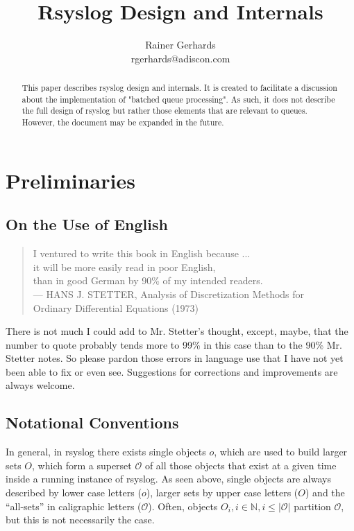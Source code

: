 \documentclass[a4paper,10pt]{article}
\title{Rsyslog Design and Internals}
\author{Rainer Gerhards\\
rgerhards@adiscon.com}
\newcommand{\IN}{\mathbb{N}}
\begin{document}
\maketitle

\begin{abstract}
This paper describes rsyslog design and internals. It is created to facilitate a discussion about the implementation of "batched queue processing". As such, it does not describe the full design of rsyslog but rather those elements that are relevant to queues. However, the document may be expanded in the future.
\end{abstract}

\tableofcontents

\section{Preliminaries}
\subsection{On the Use of English}
\begin{quotation}
\begin{flushright}
I ventured to write this book in English because ... \\
it will be more easily read in poor English, \\
than in good German by 90\% of my intended readers. \\
--- HANS J. STETTER, Analysis of Discretization Methods for \\
Ordinary Differential Equations (1973)
\end{flushright}
\end{quotation}

There is not much I could add to Mr. Stetter's thought, except, maybe, that the number to quote probably tends more to 99\% in this case than to the 90\% Mr. Stetter notes. So please pardon those errors in language use that I have not yet been able to fix or even see. Suggestions for corrections and improvements are always welcome.
\subsection{Notational Conventions}
In general, in rsyslog there exists single objects $o$, which are used to build larger sets $O$, which form a superset $\mathcal{O}$ of all those objects that exist at a given time inside a running instance of rsyslog. As seen above, single objects are always described by lower case letters ($o$), larger sets by upper case letters ($O$) and the ``all-sets'' in caligraphic letters ($\mathcal{O}$). Often, objects $O_i, i \in \IN, i \le |\mathcal{O}|$ partition $\mathcal{O}$, but this is not necessarily the case.
\end{document}
